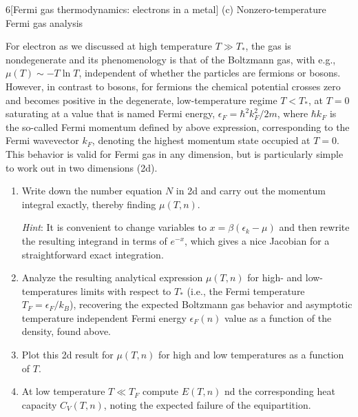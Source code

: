 \documentclass[12pt]{article}
\begin{document}
\begin{problem}{6}[Fermi gas thermodynamics: electrons in a metal]
(c) Nonzero-temperature Fermi gas analysis

For electron as we discussed at high temperature $T\gg T_\ast$, the gas is
nondegenerate and its phenomenology is that of the Boltzmann gas, with e.g.,
$\mu(T)\sim -T\ln T$, independent of whether the particles are fermions or
bosons. However, in contrast to bosons, for fermions the chemical potential
crosses zero and becomes positive in the degenerate, low-temperature regime
$T<T_\ast$, at $T=0$ saturating at a value that is named Fermi energy,
$\epsilon_F=\hbar^2k_F^2/2m$, where $\hbar k_F$ is the so-called Fermi momentum
defined by above expression, corresponding to the Fermi wavevector $k_F$,
denoting the highest momentum state occupied at $T=0$. This behavior is valid
for Fermi gas in any dimension, but is particularly simple to work out in two
dimensions (2d).

\begin{enumerate}[label=(\roman*)]
    \item Write down the number equation $N$ in 2d and carry out the momentum
        integral exactly, thereby finding $\mu(T,n)$.

        \textit{Hint}: It is convenient to change variables to
        $x=\beta(\epsilon_k-\mu)$ and then rewrite the resulting integrand in
        terms of $e^{-x}$, which gives a nice Jacobian for a straightforward
        exact integration.

    \item Analyze the resulting analytical expression $\mu(T,n)$ for high- and
        low-temperatures limits with respect to $T_\ast$ (i.e., the Fermi
        temperature $T_F=\epsilon_F/k_B$), recovering the expected Boltzmann gas
        behavior and asymptotic temperature independent Fermi energy
        $\epsilon_F(n)$ value as a function of the density, found above.

    \item Plot this 2d result for $\mu(T,n)$ for high and low temperatures as a
        function of $T$.

    \item At low temperature $T\ll T_F$ compute $E(T,n)$ nd the corresponding
        heat capacity $C_V(T,n)$, noting the expected failure of the
        equipartition.


\end{enumerate}
\end{problem}
\end{document}
